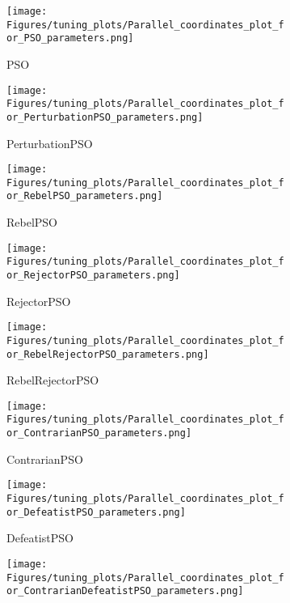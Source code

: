 \begin{figure}[H]
    \centering
    \begin{subfigure}{0.49\textwidth}
        \centering
        \texttt{[image: Figures/tuning\_plots/Parallel\_coordinates\_plot\_for\_PSO\_parameters.png]}
        \caption{PSO}
    \end{subfigure}
    \begin{subfigure}{0.49\textwidth}
        \centering
        \texttt{[image: Figures/tuning\_plots/Parallel\_coordinates\_plot\_for\_PerturbationPSO\_parameters.png]}
        \caption{PerturbationPSO}\label{fig:perturbation_params}
    \end{subfigure}
    \begin{subfigure}{0.49\textwidth}
        \centering
        \texttt{[image: Figures/tuning\_plots/Parallel\_coordinates\_plot\_for\_RebelPSO\_parameters.png]}
        \caption{RebelPSO}
    \end{subfigure}
    \begin{subfigure}{0.49\textwidth}
        \centering
        \texttt{[image: Figures/tuning\_plots/Parallel\_coordinates\_plot\_for\_RejectorPSO\_parameters.png]}
        \caption{RejectorPSO}
    \end{subfigure}
        \begin{subfigure}{0.49\textwidth}
        \centering
        \texttt{[image: Figures/tuning\_plots/Parallel\_coordinates\_plot\_for\_RebelRejectorPSO\_parameters.png]}
        \caption{RebelRejectorPSO}
    \end{subfigure}
        \begin{subfigure}{0.49\textwidth}
        \centering
        \texttt{[image: Figures/tuning\_plots/Parallel\_coordinates\_plot\_for\_ContrarianPSO\_parameters.png]}
        \caption{ContrarianPSO}
    \end{subfigure}
        \begin{subfigure}{0.49\textwidth}
        \centering
        \texttt{[image: Figures/tuning\_plots/Parallel\_coordinates\_plot\_for\_DefeatistPSO\_parameters.png]}
        \caption{DefeatistPSO}
    \end{subfigure}
      \begin{subfigure}{0.49\textwidth}
        \centering
        \texttt{[image: Figures/tuning\_plots/Parallel\_coordinates\_plot\_for\_ContrarianDefeatistPSO\_parameters.png]}

\end{subfigure}
\end{figure}
